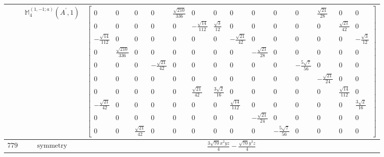 \documentclass[fleqn,8pt,landscape]{jsarticle}
\begin{document}
\begin{longtable}{ccc}
$  $ & $ \mathbb{M}_{4}^{(1,-1;a)}(A^{\prime},1) $ & $ \begin{bmatrix} 0 & 0 & 0 & 0 & \frac{\sqrt{210}}{336} & 0 & 0 & 0 & 0 & 0 & 0 & \frac{\sqrt{21}}{28} & 0 & 0 \\ 0 & 0 & 0 & 0 & 0 & - \frac{\sqrt{14}}{112} & \frac{\sqrt{3}}{12} & 0 & 0 & 0 & 0 & 0 & \frac{\sqrt{21}}{42} & 0 \\ - \frac{\sqrt{14}}{112} & 0 & 0 & 0 & 0 & 0 & 0 & - \frac{\sqrt{21}}{42} & 0 & 0 & 0 & 0 & 0 & - \frac{\sqrt{3}}{12} \\ 0 & \frac{\sqrt{210}}{336} & 0 & 0 & 0 & 0 & 0 & 0 & - \frac{\sqrt{21}}{28} & 0 & 0 & 0 & 0 & 0 \\ 0 & 0 & 0 & - \frac{\sqrt{21}}{42} & 0 & 0 & 0 & 0 & 0 & 0 & - \frac{5 \sqrt{7}}{56} & 0 & 0 & 0 \\ 0 & 0 & 0 & 0 & 0 & 0 & 0 & 0 & 0 & 0 & 0 & - \frac{\sqrt{21}}{24} & 0 & 0 \\ 0 & 0 & 0 & 0 & 0 & \frac{\sqrt{21}}{42} & \frac{3 \sqrt{2}}{16} & 0 & 0 & 0 & 0 & 0 & \frac{\sqrt{14}}{112} & 0 \\ - \frac{\sqrt{21}}{42} & 0 & 0 & 0 & 0 & 0 & 0 & \frac{\sqrt{14}}{112} & 0 & 0 & 0 & 0 & 0 & \frac{3 \sqrt{2}}{16} \\ 0 & 0 & 0 & 0 & 0 & 0 & 0 & 0 & - \frac{\sqrt{21}}{24} & 0 & 0 & 0 & 0 & 0 \\ 0 & 0 & \frac{\sqrt{21}}{42} & 0 & 0 & 0 & 0 & 0 & 0 & - \frac{5 \sqrt{7}}{56} & 0 & 0 & 0 & 0 \end{bmatrix} $ \\ \hline
$ 779 $ & $ \text{symmetry} $ & $ \frac{3 \sqrt{70} x^{2} y z}{4} - \frac{\sqrt{70} y^{3} z}{4} $ \\

\end{longtable}
\end{document}
